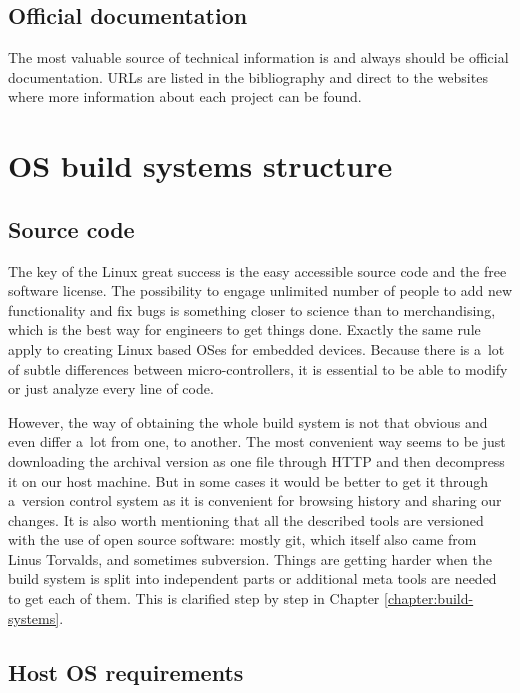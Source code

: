 \documentclass[printmode]{mgr}
\begin{document}
\subsection*{Official documentation}
The most valuable source of technical information is and always should be official documentation. URLs are listed in the bibliography and direct to the websites where more information about each project can be found.



\section{OS build systems structure}
\label{section:builders-structure}

\subsection{Source code}

The key of the Linux great success is the easy accessible source code and the free software license.
The possibility to engage unlimited number of people to add new functionality and fix bugs is something closer to science than to merchandising, which is the best way for engineers to get things done.
Exactly the same rule apply to creating Linux based OSes for embedded devices. Because there is a~lot of subtle differences between micro-controllers, it is essential to be able to modify or just analyze every line of code.

However, the way of obtaining the whole build system is not that obvious and even differ a~lot from one, to another.
The most convenient way seems to be just downloading the archival version as one file through HTTP and then decompress it on our host machine.
But in some cases it would be better to get it through a~version control system as it is convenient for browsing history and sharing our changes.
It is also worth mentioning that all the described tools are versioned with the use of open source software: mostly git, which itself also came from Linus Torvalds, and sometimes subversion.
Things are getting harder when the build system is split into independent parts or additional meta tools are needed to get each of them.
This is clarified step by step in Chapter \ref{chapter:build-systems}.


\subsection{Host OS requirements}
\end{document}
